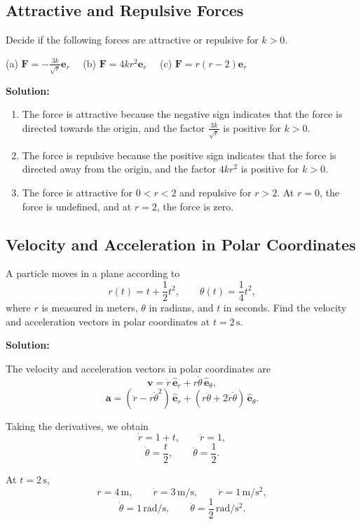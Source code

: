 \documentclass[12pt]{article}
\begin{document}
\subsection{Attractive and Repulsive Forces}
Decide if the following forces are attractive or repulsive for $k > 0$.

 (a) \( \mathbf{F} = -\frac{3k}{\sqrt{r}} \mathbf{e}_r \) ~~(b) \( \mathbf{F} = 4kr^2\mathbf{e}_r \)
~~(c) \( \mathbf{F} = r(r-2)\mathbf{e}_r \)


\textbf{Solution:}
\begin{enumerate}
    \item[(a)] The force is attractive because the negative sign indicates that the force is directed towards the origin, and the factor $\frac{3k}{\sqrt{r}}$ is positive for $k > 0$.
    \item[(b)] The force is repulsive because the positive sign indicates that the force is directed away from the origin, and the factor $4kr^2$ is positive for $k > 0$.
    \item[(c)] The force is attractive for $0 < r < 2$ and repulsive for $r > 2$. At $r = 0$, the force is undefined, and at $r = 2$, the force is zero.
\end{enumerate}


\subsection{Velocity and Acceleration in Polar Coordinates}

A particle moves in a plane according to
\[
r(t) = t + \frac{1}{2}t^2,
\qquad
\theta(t) = \frac{1}{4}t^2,
\]
where $r$ is measured in meters, $\theta$ in radians,
and $t$ in seconds. Find the velocity and acceleration vectors in polar coordinates
at $t = 2\,\mathrm{s}$.

\textbf{Solution:}

The velocity and acceleration vectors in polar coordinates are
\[
\mathbf{v} = \dot{r}\,\hat{\mathbf{e}}_r
+ r\dot{\theta}\,\hat{\mathbf{e}}_\theta,
\]
\[
\mathbf{a} =
(\ddot{r} - r\dot{\theta}^2)\,\hat{\mathbf{e}}_r
+ (r\ddot{\theta} + 2\dot{r}\dot{\theta})
\,\hat{\mathbf{e}}_\theta.
\]

Taking the derivatives, we obtain
\[
\dot{r} = 1+t, \qquad \ddot{r} = 1,
\]
\[
\dot{\theta} = \frac{t}{2},
\qquad
\ddot{\theta} = \frac{1}{2}.
\]

At $t = 2\,\mathrm{s}$,
\[
r = 4\,\mathrm{m}, \qquad
\dot{r} = 3\,\mathrm{m/s}, \qquad
\ddot{r} = 1\,\mathrm{m/s^2},
\]
\[
\dot{\theta} = 1\,\mathrm{rad/s}, \qquad
\ddot{\theta} = \frac{1}{2}\,\mathrm{rad/s^2}.
\]
\end{document}
